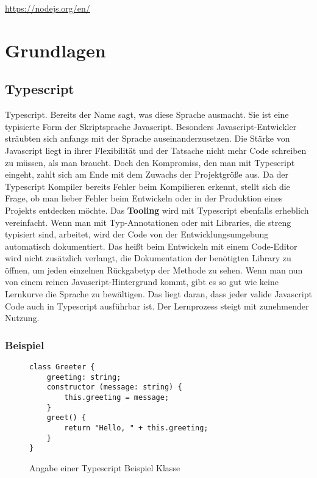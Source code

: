 \begin{center}
\url{https://nodejs.org/en/}
\end{center}

\section{Grundlagen}

\subsection{Typescript}
Typescript. Bereits der Name sagt, was diese Sprache ausmacht. Sie ist eine typisierte Form der Skriptsprache Javascript. Besonders Javascript-Entwickler sträubten sich anfangs mit der Sprache auseinanderzusetzen. Die Stärke von Javascript liegt in ihrer Flexibilität und der Tatsache nicht mehr Code schreiben zu müssen, als man braucht. Doch den Kompromiss, den man mit Typescript eingeht, zahlt sich am Ende mit dem Zuwachs der Projektgröße aus. Da der Typescript Kompiler bereits Fehler beim Kompilieren erkennt, stellt sich die Frage, ob man lieber Fehler beim Entwickeln oder in der Produktion eines Projekts entdecken möchte. Das \textbf{Tooling} wird mit Typescript ebenfalls erheblich vereinfacht. Wenn man mit Typ-Annotationen oder mit Libraries, die streng typisiert sind, arbeitet, wird der Code von der Entwicklungsumgebung automatisch dokumentiert. Das heißt beim Entwickeln mit einem Code-Editor wird nicht zusätzlich verlangt, die Dokumentation der benötigten Library zu öffnen, um jeden einzelnen Rückgabetyp der Methode zu sehen. Wenn man nun von einem reinen Javascript-Hintergrund kommt, gibt es so gut wie keine Lernkurve die Sprache zu bewältigen. Das liegt daran, dass jeder valide Javascript Code auch in Typescript ausführbar ist. Der Lernprozess steigt mit zunehmender Nutzung.

\subsubsection{Beispiel}

\begin{figure}[H]
\begin{lstlisting}[basicstyle=\small]
class Greeter {
    greeting: string;
    constructor (message: string) {
        this.greeting = message;
    }
    greet() {
        return "Hello, " + this.greeting;
    }
}  
\end{lstlisting}
\caption{Angabe einer Typescript Beispiel Klasse \cite{typescript-example}}
\end{figure}

